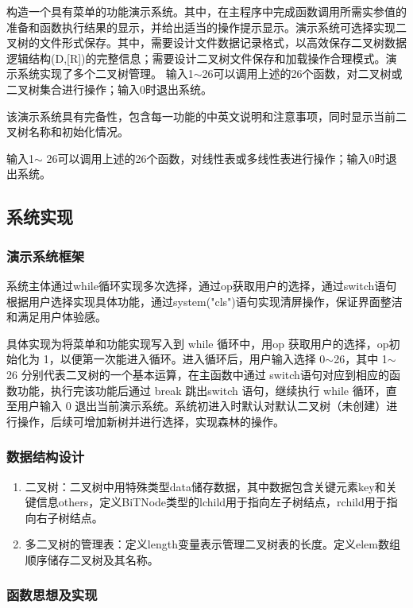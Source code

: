 \documentclass[supercite]{Experimental_Report}
\newcommand{\whiteding}[1]{\ding{\numexpr171+#1\relax}}
\theoremstyle{definition}
\begin{document}
构造一个具有菜单的功能演示系统。其中，在主程序中完成函数调用所需实参值的准备和函数执行结果的显示，并给出适当的操作提示显示。演示系统可选择实现二叉树的文件形式保存。其中，\whiteding{1}需要设计文件数据记录格式，以高效保存二叉树数据逻辑结构(D,[R])的完整信息；\whiteding{2}需要设计二叉树文件保存和加载操作合理模式。演示系统实现了多个二叉树管理。
    输入1$\sim$26可以调用上述的26个函数，对二叉树或二叉树集合进行操作；输入0时退出系统。

该演示系统具有完备性，包含每一功能的中英文说明和注意事项，同时显示当前二叉树名称和初始化情况。

输入1$\sim$ 26可以调用上述的26个函数，对线性表或多线性表进行操作；输入0时退出系统。

\subsection{系统实现}

\subsubsection{演示系统框架}

系统主体通过while循环实现多次选择，通过op获取用户的选择，通过switch语句根据用户选择实现具体功能，通过system("cls")语句实现清屏操作，保证界面整洁和满足用户体验感。

具体实现为将菜单和功能实现写入到 while 循环中，用op 获取用户的选择，op初始化为 1，以便第一次能进入循环。进入循环后，用户输入选择 0$\sim$26，其中 1$\sim$26 分别代表二叉树的一个基本运算，在主函数中通过 switch语句对应到相应的函数功能，执行完该功能后通过 break 跳出switch 语句，继续执行 while 循环，直至用户输入 0 退出当前演示系统。系统初进入时默认对默认二叉树（未创建）进行操作，后续可增加新树并进行选择，实现森林的操作。

\subsubsection{数据结构设计}

\begin{enumerate}
	\item 二叉树：二叉树中用特殊类型data储存数据，其中数据包含关键元素key和关键信息others，定义BiTNode类型的lchild用于指向左子树结点，rchild用于指向右子树结点。
	\item 多二叉树的管理表：定义length变量表示管理二叉树表的长度。定义elem数组顺序储存二叉树及其名称。
	\end{enumerate}

\subsubsection{函数思想及实现}
\end{document}
